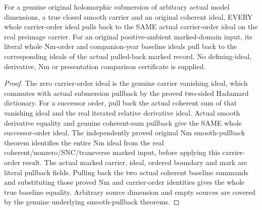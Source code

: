 \begin{theorem}
\label{hir:original-coherent-carrier-nm-year-baseline-smooth-pullback}
\leanok
For a genuine original holomorphic submersion of arbitrary actual model
dimensions, a true closed smooth carrier and an original coherent ideal,
EVERY whole carrier-order ideal pulls back to the SAME actual
carrier-order ideal on the real preimage carrier. For an original
positive-ambient marked-domain input, its literal whole Nm-order and
companion-year baseline ideals pull back to the corresponding ideals of
the actual pulled-back marked record. No defining-ideal, derivative,
Nm or presentation comparison certificate is supplied.
\end{theorem}
\begin{proof}
The zero carrier-order ideal is the genuine carrier vanishing ideal,
which commutes with actual submersion pullback by the proved two-sided
Hadamard dictionary. For a successor order, pull back the actual coherent
sum of that vanishing ideal and the real iterated relative derivative
ideal. Actual smooth derivative equality and genuine coherent-sum
pullback give the SAME whole successor-order ideal. The independently
proved original Nm smooth-pullback theorem identifies the entire Nm
ideal from the real coherent/nonzero/SNC/transverse marked input, before
applying this carrier-order result. The actual marked carrier, ideal,
ordered boundary and mark are literal pullback fields. Pulling back the
two actual coherent baseline summands and substituting those proved
Nm and carrier-order identities gives the whole true baseline equality.
Arbitrary source dimension and empty sources are covered by the genuine
underlying smooth-pullback theorems.
\end{proof}

